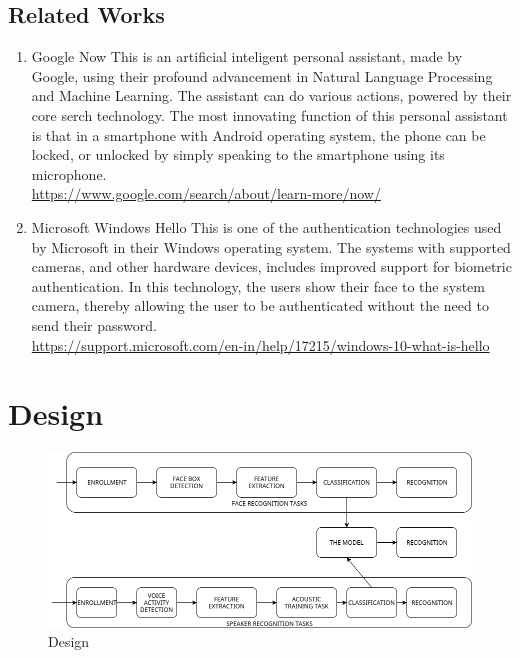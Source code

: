 \section{Related Works}
\begin{enumerate}
  \item{
    Google Now
    This is an artificial inteligent personal assistant, made by Google, using their profound advancement in Natural Language Processing and Machine Learning. The assistant can do various actions, powered by their core serch technology. The most innovating function of this personal assistant is that in a smartphone with Android operating system, the phone can be locked, or unlocked by simply speaking to the smartphone using its microphone.  \\
    \url{https://www.google.com/search/about/learn-more/now/}
  }
  \item{
    Microsoft Windows Hello
    This is one of the authentication technologies used by Microsoft in their Windows operating system. The systems with supported cameras, and other hardware devices, includes improved support for biometric authentication. In this technology, the users show their face to the system camera, thereby allowing the user to be authenticated without the need to send their password. \\
    \url{https://support.microsoft.com/en-in/help/17215/windows-10-what-is-hello}
  }
\end{enumerate}



\chapter{Design}

\begin{figure}[H]%
\centering
\includegraphics[width=5.5in]{./design.png}
\caption{Design}
\label{fig:High_Level_Design}
\end{figure}

